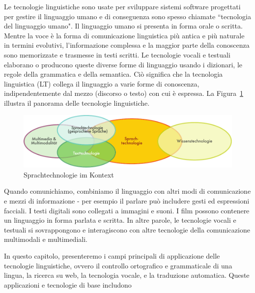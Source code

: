 \documentclass[]{../../metanetpaper}
\begin{document}
\begin{multicols}{2}

Le tecnologie linguistiche sono usate per sviluppare sistemi software
progettati per gestire il linguaggio umano e di conseguenza sono spesso
chiamate “tecnologia del linguaggio umano". Il linguaggio umano si presenta in
forma orale o scritta. Mentre la voce \`{e} la forma di comunicazione
linguistica pi\`{u} antica e pi\`{u} naturale in termini evolutivi,
l'informazione complessa e la maggior parte della conoscenza sono memorizzate
e trasmesse in testi scritti. Le tecnologie vocali e testuali elaborano o
producono queste diverse forme di linguaggio usando i dizionari, le regole
della grammatica e della semantica. Ci\`{o} significa che la tecnologia
linguistica (LT) collega il linguaggio a varie forme di conoscenza,
indipendentemente dal mezzo (discorso o testo) con cui \`{e} espressa. La
Figura~\ref{fig:ltincontext_de} illustra il panorama delle tecnologie
linguistiche. 


\begin{figure}[htb]
  \center
  \includegraphics[width=\textwidth]{../_media/german/language_technologies}
  \caption{Sprachtechnologie im Kontext}
  \label{fig:ltincontext_de}
\end{figure}

Quando comunichiamo, combiniamo il linguaggio con altri modi di comunicazione
e mezzi di informazione - per esempio il parlare pu\`{o} includere gesti ed
espressioni facciali. I testi digitali sono collegati a immagini e suoni. I
film possono contenere un linguaggio in forma parlata e scritta. In altre
parole, le tecnologie vocali e testuali si sovrappongono e interagiscono con
altre tecnologie della comunicazione multimodali e multimediali.


In questo capitolo, presenteremo i campi principali di applicazione delle
tecnologie linguistiche, ovvero il controllo ortografico e grammaticale di una
lingua, la ricerca su web, la tecnologia vocale, e la traduzione automatica.
Queste applicazioni e tecnologie di base includono



\end{multicols}
\end{document}
